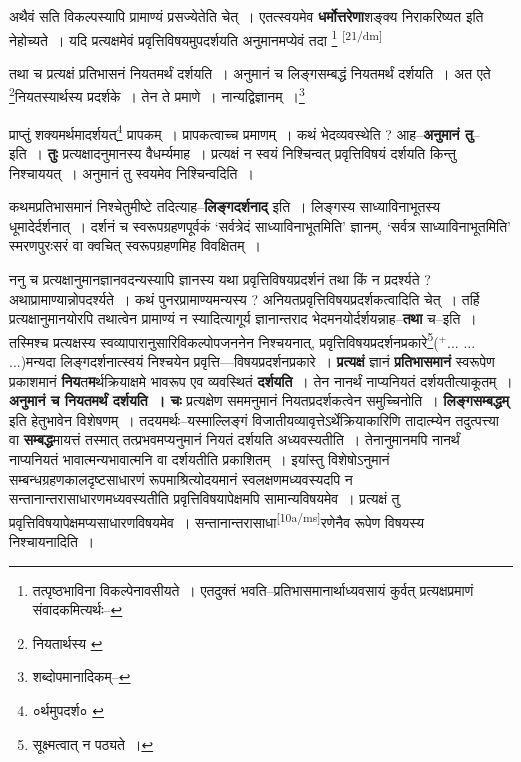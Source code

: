 \documentclass[article,12pt,a4paper]{memoir}
\newcommand{\add}[1]{($^{+}$#1)}
\begin{document}
	  \pstart अथैवं सति विकल्पस्यापि प्रामाण्यं प्रसज्येतेति चेत् । एतत्स्वयमेव \textbf{धर्मोत्तरेणा}शङ्क्य निराकरिष्यत इति नेहोच्यते । यदि प्रत्यक्षमेवं प्रवृत्तिविषयमुपदर्शयति अनुमानमप्येवं तदा  \footnote{तत्पृष्ठभाविना विकल्पेनावसीयते । एतदुक्तं भवति--प्रतिभासमानार्थाध्यवसायं कुर्वत् प्रत्यक्षप्रमाणं संवादकमित्यर्थः--\cite{dp-msD-n}}  \leavevmode\textsuperscript{\rmlatinfont\tiny [21/dm]} 
	  
	तथा च प्रत्यक्षं प्रतिभासनं नियतमर्थं दर्शयति । अनुमानं च लिङ्गसम्बद्धं नियतमर्थं दर्शयति । अत एते \footnote{नियतार्थस्य \cite{dp-msB}}नियतस्यार्थस्य प्रदर्शके । तेन ते प्रमाणे । नान्यद्विज्ञानम् ।\footnote{शब्दोपमानादिकम्--\cite{dp-msD-n}} 
	  
	प्राप्तुं शक्यमर्थमादर्शयत्\footnote{०र्थमुपदर्श० \cite{dp-msC} \cite{dp-msD} \cite{dp-msB}} प्रापकम् । प्रापकत्वाच्च प्रमाणम् । कथं भेदव्यवस्थेति ? आह--\textbf{अनुमानं तु}--इति । \textbf{तुः} प्रत्यक्षादनुमानस्य वैधर्म्यमाह । प्रत्यक्षं न स्वयं निश्चिन्वत् प्रवृत्तिविषयं दर्शयति किन्तु निश्चाययत् । अनुमानं तु स्वयमेव निश्चिन्वदिति ।
	\pend
      

	  \pstart कथमप्रतिभासमानं निश्चेतुमीष्टे तदित्याह--\textbf{लिङ्गदर्शनाद्} इति । लिङ्गस्य साध्याविनाभूतस्य धूमादेर्दर्शनात् । दर्शनं च स्वरूपग्रहणपूर्वकं ‘सर्वत्रेदं साध्याविनाभूतमिति’ ज्ञानम्, ‘सर्वत्र साध्याविनाभूतमिति’ स्मरणपुरःसरं वा क्वचित् स्वरूपग्रहणमिह विवक्षितम् ।
	\pend
      

	  \pstart ननु च प्रत्यक्षानुमानज्ञानवदन्यस्यापि ज्ञानस्य यथा प्रवृत्तिविषयप्रदर्शनं तथा किं न प्रदर्श्यते ? अथाप्रामाण्यान्नोपदर्श्यते । कथं पुनरप्रामाण्यमन्यस्य ? अनियतप्रवृत्तिविषयप्रदर्शकत्वादिति चेत् । तर्हि प्रत्यक्षानुमानयोरपि तथात्वेन प्रामाण्यं न स्यादित्यागूर्य ज्ञानान्तराद भेदमनयोर्दर्शयन्नाह--\textbf{तथा} च--इति । तस्मिश्च प्रत्यक्षस्य स्वव्यापारानुसारिविकल्पोपजननेन निश्चयनात्, प्रवृत्तिविषयप्रदर्शनप्रकारे\footnote{सूक्ष्मत्वात् न पठ्यते ।}\add{... ... ...}मन्यदा लिङ्गदर्शनात्स्वयं निश्चयेन प्रवृत्ति—विषयप्रदर्शनप्रकारे । \textbf{प्रत्यक्षं} ज्ञानं \textbf{प्रतिभासमानं} स्वरूपेण प्रकाशमानं \textbf{निय}त\textbf{म}र्थक्रियाक्षमे भावरूप एव व्यवस्थितं \textbf{दर्शयति} । तेन नानर्थं नाप्यनियतं दर्शयतीत्याकूतम् । \textbf{अनुमानं च नियतमर्थं दर्शयति । चः} प्रत्यक्षेण सममनुमानं नियतप्रदर्शकत्वेन समुच्चिनोति । \textbf{लिङ्गसम्बद्धम्} इति हेतुभावेन विशेषणम् । तदयमर्थः--यस्माल्लिङ्गं विजातीयव्यावृत्तेऽर्थेक्रियाकारिणि तादात्म्येन तदुत्पत्त्या वा \textbf{सम्बद्ध}मायत्तं तस्मात् तत्प्रभवमप्यनुमानं नियतं दर्शयति अध्यवस्यतीति । तेनानुमानमपि नानर्थं नाप्यनियतं भावात्मन्यभावात्मनि वा दर्शयतीति प्रकाशितम् । इयांस्तु विशेषोऽनुमानं सम्बन्धग्रहणकालदृष्टसाधारणं रूपमाश्रित्योदयमानं स्वलक्षणमध्यवस्यदपि न सन्तानान्तरासाधारणमध्यवस्यतीति प्रवृत्तिविषयापेक्षमपि सामान्यविषयमेव । प्रत्यक्षं तु प्रवृत्तिविषयापेक्षमप्यसाधारणविषयमेव । सन्तानान्तरासाधा\leavevmode\textsuperscript{\rmlatinfont\tiny [10a/ms]}रणेनैव रूपेण विषयस्य निश्चायनादिति ।
	\pend
      
\end{document}
